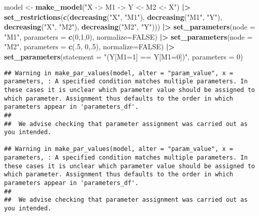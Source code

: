 \documentclass[
  12pt,
]{book}
\newenvironment{Shaded}{\begin{snugshade}}{\end{snugshade}}
\newcommand{\AttributeTok}[1]{\textcolor[rgb]{0.13,0.29,0.53}{#1}}
\newcommand{\ConstantTok}[1]{\textcolor[rgb]{0.56,0.35,0.01}{#1}}
\newcommand{\DecValTok}[1]{\textcolor[rgb]{0.00,0.00,0.81}{#1}}
\newcommand{\FunctionTok}[1]{\textcolor[rgb]{0.13,0.29,0.53}{\textbf{#1}}}
\newcommand{\NormalTok}[1]{#1}
\newcommand{\OtherTok}[1]{\textcolor[rgb]{0.56,0.35,0.01}{#1}}
\newcommand{\SpecialCharTok}[1]{\textcolor[rgb]{0.81,0.36,0.00}{\textbf{#1}}}
\newcommand{\StringTok}[1]{\textcolor[rgb]{0.31,0.60,0.02}{#1}}
\begin{document}
\begin{Shaded}
\begin{Highlighting}[]
\NormalTok{model }\OtherTok{\textless{}{-}} \FunctionTok{make\_model}\NormalTok{(}\StringTok{"X {-}\textgreater{} M1 {-}\textgreater{} Y \textless{}{-} M2 \textless{}{-} X"}\NormalTok{) }\SpecialCharTok{|\textgreater{}}
  \FunctionTok{set\_restrictions}\NormalTok{(}\FunctionTok{c}\NormalTok{(}\FunctionTok{decreasing}\NormalTok{(}\StringTok{"X"}\NormalTok{, }\StringTok{"M1"}\NormalTok{), }
                     \FunctionTok{decreasing}\NormalTok{(}\StringTok{"M1"}\NormalTok{, }\StringTok{"Y"}\NormalTok{),}
                     \FunctionTok{decreasing}\NormalTok{(}\StringTok{"X"}\NormalTok{, }\StringTok{"M2"}\NormalTok{), }
                     \FunctionTok{decreasing}\NormalTok{(}\StringTok{"M2"}\NormalTok{, }\StringTok{"Y"}\NormalTok{))) }\SpecialCharTok{|\textgreater{}}
  \FunctionTok{set\_parameters}\NormalTok{(}\AttributeTok{node =} \StringTok{"M1"}\NormalTok{, }\AttributeTok{parameters =} \FunctionTok{c}\NormalTok{(}\DecValTok{0}\NormalTok{,}\DecValTok{1}\NormalTok{,}\DecValTok{0}\NormalTok{), }\AttributeTok{normalize=}\ConstantTok{FALSE}\NormalTok{)  }\SpecialCharTok{|\textgreater{}}
  \FunctionTok{set\_parameters}\NormalTok{(}\AttributeTok{node =} \StringTok{"M2"}\NormalTok{, }\AttributeTok{parameters =} \FunctionTok{c}\NormalTok{(.}\DecValTok{5}\NormalTok{, }\DecValTok{0}\NormalTok{,.}\DecValTok{5}\NormalTok{), }\AttributeTok{normalize=}\ConstantTok{FALSE}\NormalTok{)  }\SpecialCharTok{|\textgreater{}}
  \FunctionTok{set\_parameters}\NormalTok{(}\AttributeTok{statement =} \StringTok{"(Y[M1=1] == Y[M1=0])"}\NormalTok{, }\AttributeTok{parameters =} \DecValTok{0}\NormalTok{)  }
\end{Highlighting}
\end{Shaded}

\begin{verbatim}
## Warning in make_par_values(model, alter = "param_value", x = parameters, : A specified condition matches multiple parameters. In these cases it is unclear which parameter value should be assigned to which parameter. Assignment thus defaults to the order in which parameters appear in 'parameters_df'.
##               
##  We advise checking that parameter assignment was carried out as you intended.

## Warning in make_par_values(model, alter = "param_value", x = parameters, : A specified condition matches multiple parameters. In these cases it is unclear which parameter value should be assigned to which parameter. Assignment thus defaults to the order in which parameters appear in 'parameters_df'.
##               
##  We advise checking that parameter assignment was carried out as you intended.
\end{verbatim}
\end{document}
